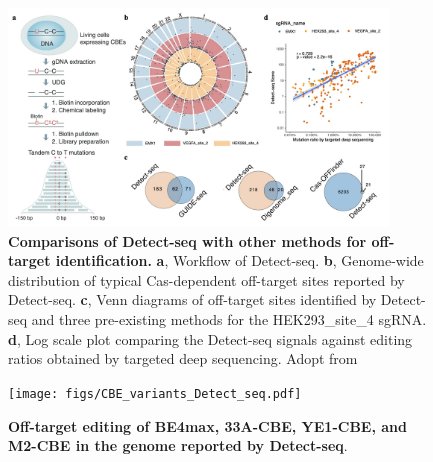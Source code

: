 \documentclass[12pt]{article}
\begin{document}
\clearpage
\begin{figure}[htb]
	\centering
	\includegraphics[width=0.9\textwidth]{figs/CBE_Detect_seq.jpg} 
	\caption{\textbf{Comparisons of Detect-seq with other methods for off-target identification.}
    \textbf{a}, Workflow of Detect-seq. 
    \textbf{b}, Genome-wide distribution of typical Cas-dependent off-target sites reported by Detect-seq.
    \textbf{c}, Venn diagrams of off-target sites identified by Detect-seq and three pre-existing methods for the HEK293\_site\_4 sgRNA.
    \textbf{d}, Log scale plot comparing the Detect-seq signals against editing ratios obtained by targeted deep sequencing.
    Adopt from \cite{lei2021detect}}
	\label{fig:CBE_Detect_seq}
\end{figure}

\begin{figure}[htb]
	\centering
	\texttt{[image: figs/CBE\_variants\_Detect\_seq.pdf]} 
	\caption{\textbf{Off-target editing of BE4max, 33A-CBE, YE1-CBE, and M2-CBE in the genome reported by Detect-seq}.}
	\label{fig:CBE_variants_Detect_seq}
\end{figure}
\end{document}
